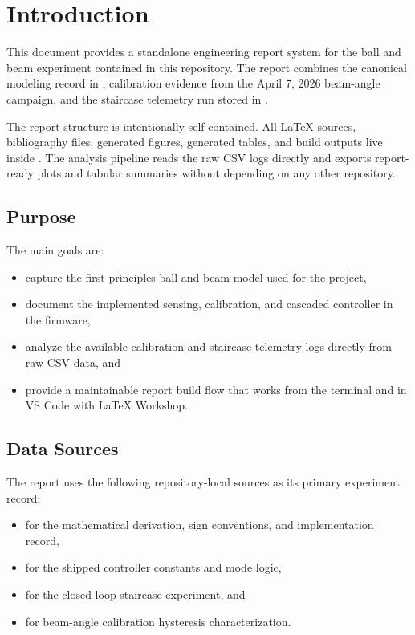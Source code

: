 \chapter{Introduction}

This document provides a standalone engineering report system for the ball and beam
experiment contained in this repository. The report combines the canonical modeling
record in , calibration evidence from the April 7, 2026 beam-angle
campaign, and the staircase telemetry run stored in
.

The report structure is intentionally self-contained. All LaTeX sources, bibliography
files, generated figures, generated tables, and build outputs live inside
. The analysis pipeline reads the raw CSV logs directly and exports
report-ready plots and tabular summaries without depending on any other repository.

\section{Purpose}

The main goals are:

\begin{itemize}
  \item capture the first-principles ball and beam model used for the project,
  \item document the implemented sensing, calibration, and cascaded controller in
  the firmware,
  \item analyze the available calibration and staircase telemetry logs directly from
  raw CSV data, and
  \item provide a maintainable report build flow that works from the terminal and in
  VS Code with LaTeX Workshop.
\end{itemize}

\section{Data Sources}

The report uses the following repository-local sources as its primary experiment record:

\begin{itemize}
  \item {} for the mathematical derivation, sign conventions, and
  implementation record,
  \item {} for the shipped controller constants and mode logic,
  \item {} for the closed-loop
  staircase experiment, and
  \item {}
  for beam-angle calibration hysteresis characterization.
\end{itemize}

